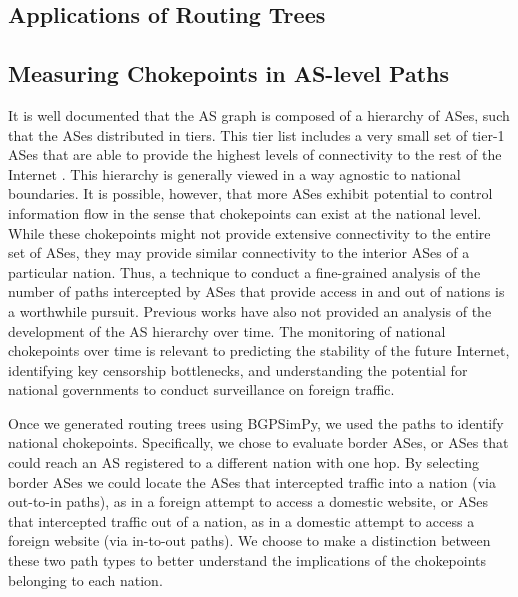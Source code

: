 \documentclass{article}
\begin{document}
\begin{multicols}{2}
\section{Applications of Routing Trees}
\subsection{Measuring Chokepoints in AS-level Paths}

It is well documented that the AS graph is composed of a hierarchy of ASes, such that the ASes
distributed in tiers. This tier list includes a very small set of tier-1 ASes
that are able to provide the highest levels of connectivity to the rest of the Internet \cite{hierarchy}.
This hierarchy is generally viewed in a way agnostic to national boundaries. It is
possible, however, that more ASes exhibit potential to control information flow in the sense that
chokepoints can exist at the national level. While these chokepoints might not provide extensive connectivity
to the entire set of ASes, they may provide similar connectivity to the interior ASes of a particular nation. 
Thus, a technique to conduct a fine-grained analysis of the number of paths intercepted by ASes that provide access
in and out of nations is a worthwhile pursuit. Previous works have also not provided an analysis of the development of
the AS hierarchy over time. The monitoring of national chokepoints over time is relevant to predicting the stability of the
future Internet, identifying key censorship bottlenecks, and understanding the potential for national governments to conduct
surveillance on foreign traffic.

\par

Once we generated routing trees using BGPSimPy, we
used the paths to identify national chokepoints. Specifically, we chose to evaluate border
ASes, or ASes that could reach an AS registered to a different nation with one
hop. By selecting border ASes we could locate the ASes that intercepted
traffic into a nation (via out-to-in paths), as in a foreign attempt to access
a domestic website, or ASes that intercepted traffic out of a nation, as in a
domestic attempt to access a foreign website (via in-to-out paths). We choose
to make a distinction between these two path types to better understand the
implications of the chokepoints belonging to each nation.


\end{multicols}
\end{document}
